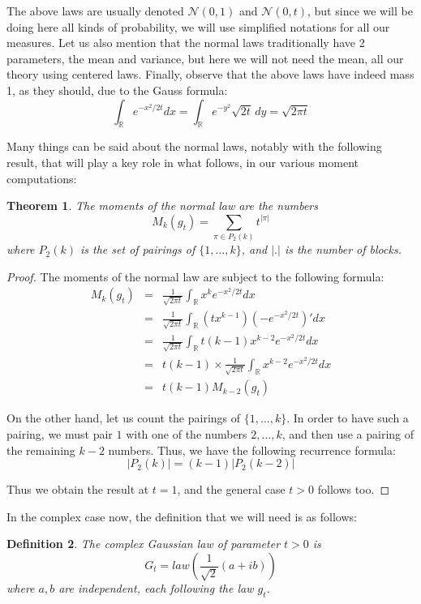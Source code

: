 \documentclass[12pt]{amsbook}
\newtheorem{theorem}{Theorem}[chapter]
\newtheorem{definition}[theorem]{Definition}
\begin{document}
The above laws are usually denoted $\mathcal N(0,1)$ and $\mathcal N(0,t)$, but since we will be doing here all kinds of probability, we will use simplified notations for all our measures. Let us also mention that the normal laws traditionally have 2 parameters, the mean and variance, but here we will not need the mean, all our theory using centered laws. Finally, observe that the above laws have indeed mass 1, as they should, due to the Gauss formula:
$$\int_\mathbb R e^{-x^2/2t}dx
=\int_\mathbb R e^{-y^2}\sqrt{2t}\,dy
=\sqrt{2\pi t}$$

Many things can be said about the normal laws, notably with the following result, that will play a key role in what follows, in our various moment computations:

\begin{theorem}
The moments of the normal law are the numbers
$$M_k(g_t)=\sum_{\pi\in P_2(k)}t^{|\pi|}$$
where $P_2(k)$ is the set of pairings of $\{1,\ldots,k\}$, and $|.|$ is the number of blocks.
\end{theorem}

\begin{proof}
The moments of the normal law are subject to the following formula:
\begin{eqnarray*}
M_k(g_t)
&=&\frac{1}{\sqrt{2\pi t}}\int_\mathbb Rx^ke^{-x^2/2t}dx\\
&=&\frac{1}{\sqrt{2\pi t}}\int_\mathbb R(tx^{k-1})\left(-e^{-x^2/2t}\right)'dx\\
&=&\frac{1}{\sqrt{2\pi t}}\int_\mathbb Rt(k-1)x^{k-2}e^{-x^2/2t}dx\\
&=&t(k-1)\times\frac{1}{\sqrt{2\pi t}}\int_\mathbb Rx^{k-2}e^{-x^2/2t}dx\\
&=&t(k-1)M_{k-2}(g_t)
\end{eqnarray*}

On the other hand, let us count the pairings of $\{1,\ldots,k\}$. In order to have such a pairing, we must pair $1$ with one of the numbers $2,\ldots,k$, and then use a pairing of the remaining $k-2$ numbers. Thus, we have the following recurrence formula:
$$|P_2(k)|=(k-1)|P_2(k-2)|$$

Thus we obtain the result at $t=1$, and the general case $t>0$ follows too.
\end{proof}

In the complex case now, the definition that we will need is as follows:

\begin{definition}
The complex Gaussian law of parameter $t>0$ is
$$G_t=law\left(\frac{1}{\sqrt{2}}(a+ib)\right)$$
where $a,b$ are independent, each following the law $g_t$.
\end{definition}
\end{document}
